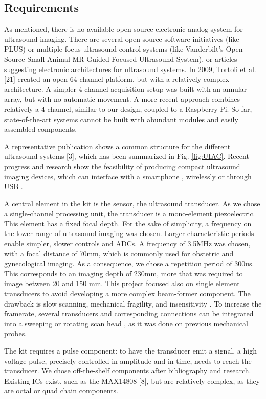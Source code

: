 \documentclass[letterpaper, 10 pt, conference]{ieeeconf} %
\begin{document}
\subsection{Requirements}

As mentioned, there is no available open-source electronic analog system for ultrasound imaging. There are several open-source software initiatives (like PLUS) or multiple-focus ultrasound control systems (like Vanderbilt's Open-Source Small-Animal MR-Guided Focused Ultrasound System), or articles suggesting electronic architectures for ultrasound systems. In 2009, Tortoli et al. [21] created an open 64-channel platform, but with a relatively complex architecture. A simpler 4-channel acquisition setup was built with an annular array, but with no automatic movement. A more recent approach combines relatively a 4-channel\cite{c22}, similar to our design, coupled to a Raspberry Pi. So far, state-of-the-art systems cannot be built with abundant modules and easily assembled components.

A representative publication shows a common structure for the different ultrasound systems [3], which has been summarized in Fig. \ref{fig:UIAC}. Recent progress and research show the feasibility of producing compact ultrasound imaging devices, which can interface with a smartphone \cite{c8}, wirelessly or through USB \cite{c20}.

A central element in the kit is the sensor, the ultrasound transducer. As we chose a single-channel processing unit, the transducer is a mono-element piezoelectric. This element has a fixed focal depth. For the sake of simplicity, a frequency on the lower range of ultrasound imaging was chosen. Larger characteristic periods enable simpler, slower controls and ADCs. A frequency of 3.5MHz was chosen, with a focal distance of 70mm, which is commonly used for obstetric and gynecological imaging. As a consequence, we chose a repetition period of 300us. This corresponds to an imaging depth of 230mm, more that was required to image between 20 and 150 mm. This project focused also on single element transducers to avoid developing a more complex beam-former component. The drawback is slow scanning, mechanical fragility, and insensitivity \cite{c12}. To increase the framerate, several transducers and corresponding connections can be integrated into a sweeping or rotating scan head \cite{c13}, as it was done on previous mechanical probes.

The kit requires a pulse component: to have the transducer emit a signal, a high voltage pulse, precisely controlled in amplitude and in time, needs to reach the transducer. We chose off-the-shelf components after bibliography and research. Existing ICs exist, such as the MAX14808 [8], but are relatively complex, as they are octal or quad chain components.
\end{document}
